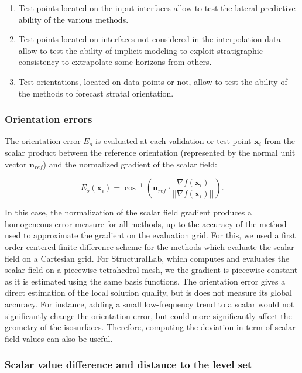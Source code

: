 \documentclass[final]{ring20}
\newcommand{\bx}{\mathbf{x}}
\newcommand{\bn}{\mathbf{n}}
\begin{document}
{\begin{enumerate}
	\item Test points located on the input interfaces allow to test the lateral predictive ability of the various methods.  
  \item Test points located on interfaces not considered in the interpolation data allow to test the ability of implicit modeling to exploit stratigraphic consistency to extrapolate some horizons from others. 
  \item Test orientations, located on data points or not, allow to test the ability of the methods to forecast stratal orientation. 
\end{enumerate}


\subsubsection{Orientation errors}

The orientation error $E_o$ is evaluated at each validation or test point $\bx_i$ from the scalar product between the reference orientation (represented by the normal unit vector $\bn_{ref}$) and the normalized gradient of the scalar field:

\begin{equation}
\label{eq:erro}
E_o(\bx_i) = \cos^{-1} \left( \bn_{ref} \cdot \frac{\nabla f(\bx_i)}{||\nabla f(\bx_i)||} \right).
\end{equation}

In this case, the normalization of the scalar field gradient produces a homogeneous error measure for all methods, up to the accuracy of the method used to approximate the gradient on the evaluation grid. For this, we used a first order centered finite difference scheme for the methods which evaluate the scalar field on a Cartesian grid. For StructuralLab, which computes and evaluates the scalar field on a piecewise tetrahedral mesh, we the gradient is piecewise constant as it is estimated using the same basis functions. 
The orientation error gives a direct estimation of the local solution quality, but is does not measure its global accuracy. For instance, adding a small low-frequency trend to a scalar would not significantly change the orientation error, but could more significantly affect the geometry of the isosurfaces. Therefore, computing the deviation in term of scalar field values can also be useful. 

\subsubsection{Scalar value difference and distance to the level set}

}
\end{document}
